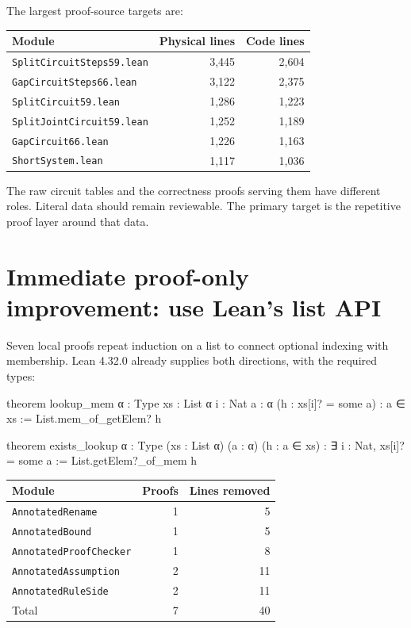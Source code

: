\documentclass[11pt,letterpaper]{article}
\newcommand{\code}[1]{\nolinkurl{#1}}
\begin{document}
The largest proof-source targets are:

\begin{center}
\begin{tabular}{@{}p{}rr@{}}
\toprule
Module & Physical lines & Code lines\\\midrule
\code{SplitCircuitSteps59.lean} & 3,445 & 2,604\\
\code{GapCircuitSteps66.lean} & 3,122 & 2,375\\
\code{SplitCircuit59.lean} & 1,286 & 1,223\\
\code{SplitJointCircuit59.lean} & 1,252 & 1,189\\
\code{GapCircuit66.lean} & 1,226 & 1,163\\
\code{ShortSystem.lean} & 1,117 & 1,036\\
\bottomrule
\end{tabular}
\end{center}

The raw circuit tables and the correctness proofs serving them have
different roles. Literal data should remain reviewable. The primary target
is the repetitive proof layer around that data.

\section{Immediate proof-only improvement: use Lean's list API}

Seven local proofs repeat induction on a list to connect optional indexing
with membership. Lean 4.32.0 already supplies both directions, with the
required types:

\begin{Lean}
theorem lookup_mem {α : Type} {xs : List α} {i : Nat} {a : α}
    (h : xs[i]? = some a) : a ∈ xs :=
  List.mem_of_getElem? h

theorem exists_lookup {α : Type} (xs : List α) (a : α)
    (h : a ∈ xs) : ∃ i : Nat, xs[i]? = some a :=
  List.getElem?_of_mem h
\end{Lean}

\begin{center}
\begin{tabular}{@{}p{}rr@{}}
\toprule
Module & Proofs & Lines removed\\\midrule
\code{AnnotatedRename} & 1 & 5\\
\code{AnnotatedBound} & 1 & 5\\
\code{AnnotatedProofChecker} & 1 & 8\\
\code{AnnotatedAssumption} & 2 & 11\\
\code{AnnotatedRuleSide} & 2 & 11\\\midrule
Total & 7 & 40\\
\bottomrule
\end{tabular}
\end{center}
\end{document}
